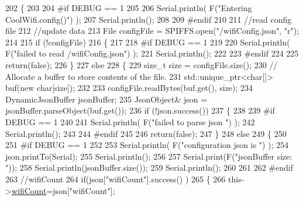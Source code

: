 \begin{DoxyCode}
202 \{
203 
204 \textcolor{preprocessor}{#if DEBUG == 1 }
205 
206     Serial.println( F(\textcolor{stringliteral}{"Entering CoolWifi.config()"}) );
207     Serial.println();
208 
209 \textcolor{preprocessor}{#endif}
210 
211     \textcolor{comment}{//read config file}
212     \textcolor{comment}{//update data}
213     File configFile = SPIFFS.open(\textcolor{stringliteral}{"/wifiConfig.json"}, \textcolor{stringliteral}{"r"});
214 
215     \textcolor{keywordflow}{if} (!configFile) 
216     \{
217     
218 \textcolor{preprocessor}{    #if DEBUG == 1 }
219 
220         Serial.println( F(\textcolor{stringliteral}{"failed to read /wifiConfig.json"}) );
221         Serial.println();
222 
223 \textcolor{preprocessor}{    #endif}
224 
225         \textcolor{keywordflow}{return}(\textcolor{keyword}{false});
226     \}
227     \textcolor{keywordflow}{else}
228     \{
229         \textcolor{keywordtype}{size\_t} size = configFile.size();
230         \textcolor{comment}{// Allocate a buffer to store contents of the file.}
231         std::unique\_ptr<char[]> buf(\textcolor{keyword}{new} \textcolor{keywordtype}{char}[size]);
232 
233         configFile.readBytes(buf.get(), size);
234         DynamicJsonBuffer jsonBuffer;
235         JsonObject& json = jsonBuffer.parseObject(buf.get());
236         \textcolor{keywordflow}{if} (!json.success()) 
237         \{
238         
239 \textcolor{preprocessor}{        #if DEBUG == 1 }
240 
241             Serial.println( F(\textcolor{stringliteral}{"failed to parse json "}) );
242             Serial.println();
243         
244 \textcolor{preprocessor}{        #endif}
245             
246             \textcolor{keywordflow}{return}(\textcolor{keyword}{false});
247         \} 
248         \textcolor{keywordflow}{else}
249         \{
250         
251 \textcolor{preprocessor}{        #if DEBUG == 1 }
252         
253             Serial.println( F(\textcolor{stringliteral}{"configuration json is "}) );
254             json.printTo(Serial);
255             Serial.println();
256 
257             Serial.print(F(\textcolor{stringliteral}{"jsonBuffer size: "}));
258             Serial.println(jsonBuffer.size());
259             Serial.println();
260 
261 
262 \textcolor{preprocessor}{        #endif}
263             \textcolor{comment}{//wifiCount}
264             \textcolor{keywordflow}{if}(json[\textcolor{stringliteral}{"wifiCount"}].success() )
265             \{           
266                 this->\hyperlink{classCoolWifi_ab133bd92fcb895b884deecd6678592e4}{wifiCount}=json[\textcolor{stringliteral}{"wifiCount"}];

\end{DoxyCode}
